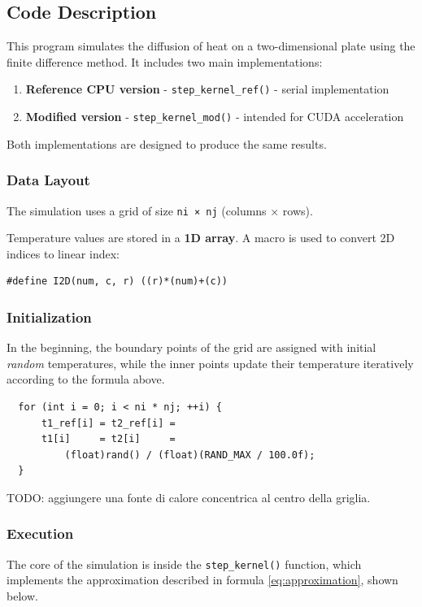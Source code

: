 \subsection{Code Description}
This program simulates the diffusion of heat on a two-dimensional plate using the finite difference method. It includes two main implementations:
\begin{enumerate}
    \item \textbf{Reference CPU version} - \texttt{step\_kernel\_ref()} - serial implementation
    \item \textbf{Modified version} - \texttt{step\_kernel\_mod()} - intended for CUDA acceleration
\end{enumerate}

Both implementations are designed to produce the same results.

\subsubsection*{Data Layout}
The simulation uses a grid of size \texttt{ni × nj} (columns × rows).

\noindent
Temperature values are stored in a \textbf{1D array}. A macro is used to convert 2D indices to linear index:

\begin{lstlisting}
#define I2D(num, c, r) ((r)*(num)+(c))
\end{lstlisting}

\subsubsection*{Initialization}
In the beginning, the boundary points of the grid are assigned with initial \textit{random} temperatures, while the inner points update their temperature iteratively according to the formula above.\\

\begin{lstlisting}
  for (int i = 0; i < ni * nj; ++i) {
      t1_ref[i] = t2_ref[i] =
      t1[i]     = t2[i]     =
          (float)rand() / (float)(RAND_MAX / 100.0f);
  }
\end{lstlisting}

\noindent
TODO: aggiungere una fonte di calore concentrica al centro della griglia.

\newpage

\subsubsection*{Execution}
The core of the simulation is inside the \texttt{step\_kernel()} function, which implements the approximation described in formula \eqref{eq:approximation}, shown below.


